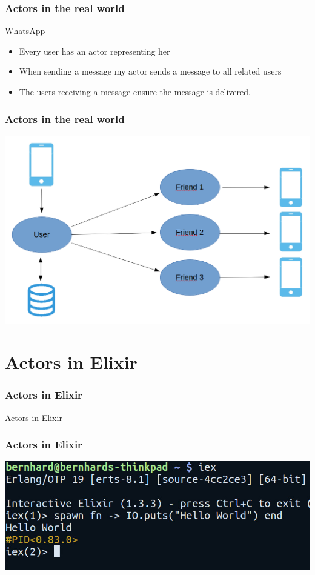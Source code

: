 \documentclass{beamer}
\begin{document}

\begin{frame}
\frametitle{Actors in the real world}
\Huge{WhatsApp}
\Large
\begin{itemize}
\item Every user has an actor representing her
\item When sending a message my actor sends a message to all related users
\item The users receiving a message ensure the message is delivered.
\end{itemize}
\end{frame}


\begin{frame}
\frametitle{Actors in the real world}
\includegraphics[width=0.95\linewidth]{./images/whatsapp_actor.png}
\end{frame}


\section{Actors in Elixir}

\begin{frame}
\frametitle{Actors in Elixir}
\Huge{\centerline{Actors in Elixir}}
\end{frame}


\begin{frame}
\frametitle{Actors in Elixir}
\includegraphics[width=1\linewidth]{./images/hello_elixir.jpg}
\end{frame}
\end{document}
